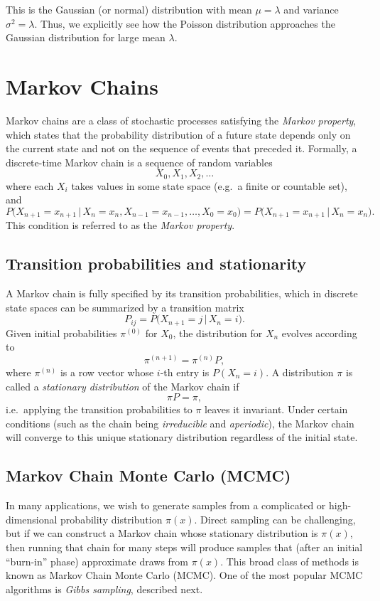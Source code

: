 This is the Gaussian (or normal) distribution with mean $\mu = \lambda$ and variance $\sigma^2 = \lambda$. Thus, we explicitly see how the Poisson distribution approaches the Gaussian distribution for large mean $\lambda$.




\section{Markov Chains}
Markov chains are a class of stochastic processes satisfying the \textit{Markov property}, which states that the probability distribution of a future state depends only on the current state and not on the sequence of events that preceded it. Formally, a discrete-time Markov chain is a sequence of random variables
\[
X_0, X_1, X_2, \dots
\]
where each \(X_i\) takes values in some state space (e.g.\ a finite or countable set), and
\[
P\big(X_{n+1} = x_{n+1} \,\big|\, X_n = x_n, X_{n-1} = x_{n-1}, \dots, X_0 = x_0\big)
= P\big(X_{n+1} = x_{n+1} \,\big|\, X_n = x_n\big).
\]
This condition is referred to as the \textit{Markov property}.

\subsection{Transition probabilities and stationarity}
A Markov chain is fully specified by its transition probabilities, which in discrete state spaces can be summarized by a transition matrix
\[
P_{ij} = P\big(X_{n+1} = j \,\big|\, X_n = i\big).
\]
Given initial probabilities \( \pi^{(0)} \) for \( X_0 \), the distribution for \(X_n\) evolves according to
\[
\pi^{(n+1)} = \pi^{(n)} P,
\]
where \(\pi^{(n)}\) is a row vector whose \(i\)-th entry is \(P(X_n = i)\). A distribution \(\pi\) is called a \textit{stationary distribution} of the Markov chain if
\[
\pi P = \pi,
\]
i.e.\ applying the transition probabilities to \(\pi\) leaves it invariant. Under certain conditions (such as the chain being \textit{irreducible} and \textit{aperiodic}), the Markov chain will converge to this unique stationary distribution regardless of the initial state.

\subsection{Markov Chain Monte Carlo (MCMC)}
In many applications, we wish to generate samples from a complicated or high-dimensional probability distribution \(\pi(x)\). Direct sampling can be challenging, but if we can construct a Markov chain whose stationary distribution is \(\pi(x)\), then running that chain for many steps will produce samples that (after an initial ``burn-in'' phase) approximate draws from \(\pi(x)\). This broad class of methods is known as Markov Chain Monte Carlo (MCMC). One of the most popular MCMC algorithms is \textit{Gibbs sampling}, described next.


